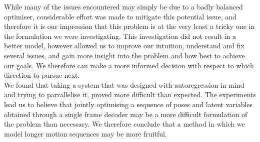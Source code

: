 While many of the issues encountered may simply be due to a badly balanced optimiser, considerable effort was made to mitigate this potential issue, and therefore it is our impression that this problem is at the very least a tricky one in the formulation we were investigating. This investigation did not result in a better model, however allowed us to improve our intuition, understand and fix several issues, and gain more insight into the problem and how best to achieve our goals. We therefore can make a more informed decision with respect to which direction to pursue next. \\
We found that taking a system that was designed with autoregression in mind and trying to parrallelise it, proved more difficult than expected. The experiments lead us to believe that jointly optimising a sequence of poses and latent variables obtained through a single frame decoder may be a more difficult formulation of the problem than necessary. We therefore conclude that a method in which we model longer motion sequences may be more fruitful.
